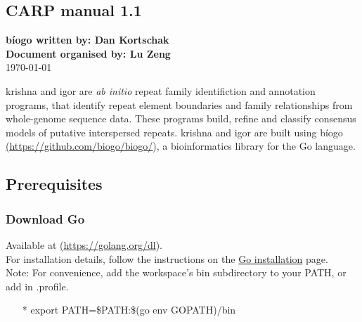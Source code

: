 \documentclass[12pt]{report}
\begin{document}
 \sloppy

\author{Author Name}
\date{Day Month Year}



\begin{center}
	\section{CARP manual 1.1}
	\noindent\textbf{b\'iogo written by: Dan Kortschak} \\
	\textbf{Document organised by: Lu Zeng} \\
	\today
\end{center}

\noindent krishna and igor are \textit{ab initio} repeat family identifiction and annotation programs, that  identify repeat element boundaries and family relationships from whole-genome sequence data. These programs build, refine and classify consensus models of putative interspersed repeats. krishna and igor are built using b\'iogo \href{<url>}(\url{https://github.com/biogo/biogo/}), a bioinformatics library for the Go language. 


\subsection*{{Prerequisites}}

\subsubsection{ Download Go }
Available at \href{<url>} (\url{https://golang.org/dl}).\\
For installation details, follow the instructions on the \href{https://golang.org/doc/install#install} {\color{blue}Go installation} page. \\
{\color{red} Note:}  For convenience, add the workspace's bin subdirectory to your PATH, or add in .profile. 

\begin{enumerate}
	\item[*] export PATH=\$PATH:\$(go env GOPATH)/bin
\end{enumerate}
\end{document}
